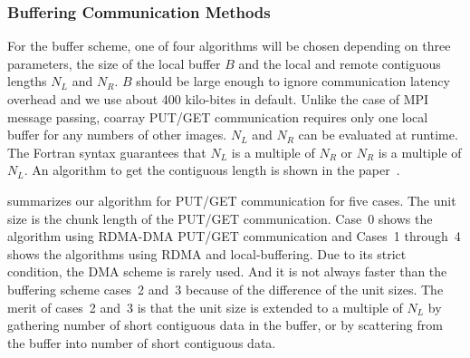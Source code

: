\subsubsection{Buffering Communication Methods}

For the buffer scheme, one of four algorithms will be chosen 
depending on three parameters, the size of the local buffer $B$ and the 
local and remote contiguous lengths $N_L$ and $N_R$.
$B$ should be large enough to ignore communication latency overhead and we use
about 400 kilo-bites in default. Unlike the case of MPI message passing,
coarray PUT/GET communication requires only one local buffer for any numbers of
other images.
$N_L$ and $N_R$ can be evaluated at runtime. The Fortran syntax guarantees 
that $N_L$ is a multiple of $N_R$ or $N_R$ is a multiple of $N_L$.
An algorithm to get the contiguous length is shown in the paper~\cite{pgas15}.

 summarizes our algorithm for PUT/GET communication for five cases.
The unit size is the chunk length of the PUT/GET communication.
Case~0 shows the algorithm using RDMA-DMA PUT/GET communication and Cases~1 through~4
shows the algorithms using RDMA and local-buffering. 
Due to its strict condition, the DMA scheme is rarely used.
And it is not always faster than the buffering scheme cases~2 and~3 because of the 
difference of the unit sizes. The merit of cases~2 and~3 is that the unit size 
is extended to a multiple of $N_L$ by gathering number of short contiguous data in the buffer,
or by scattering from the buffer into number of short contiguous data.

